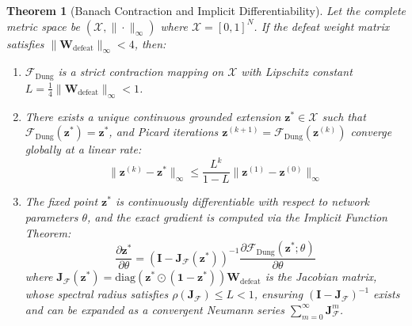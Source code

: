 \documentclass[11pt,a4paper]{article}
\newtheorem{theorem}{Theorem}
\begin{document}
\begin{theorem}[Banach Contraction and Implicit Differentiability]
\label{thm:banach_contraction}
Let the complete metric space be $(\mathcal{X}, \|\cdot\|_\infty)$ where $\mathcal{X} = [0, 1]^N$. If the defeat weight matrix satisfies $\|\mathbf{W}_{\text{defeat}}\|_\infty < 4$, then:
\begin{enumerate}[label=(\roman*)]
    \item $\mathcal{F}_{\text{Dung}}$ is a strict contraction mapping on $\mathcal{X}$ with Lipschitz constant $L = \frac{1}{4} \|\mathbf{W}_{\text{defeat}}\|_\infty < 1$.
    \item There exists a unique continuous grounded extension $\mathbf{z}^* \in \mathcal{X}$ such that $\mathcal{F}_{\text{Dung}}(\mathbf{z}^*) = \mathbf{z}^*$, and Picard iterations $\mathbf{z}^{(k+1)} = \mathcal{F}_{\text{Dung}}(\mathbf{z}^{(k)})$ converge globally at a linear rate:
    \begin{equation}
    \|\mathbf{z}^{(k)} - \mathbf{z}^*\|_\infty \le \frac{L^k}{1 - L} \|\mathbf{z}^{(1)} - \mathbf{z}^{(0)}\|_\infty
    \end{equation}
    \item The fixed point $\mathbf{z}^*$ is continuously differentiable with respect to network parameters $\theta$, and the exact gradient is computed via the Implicit Function Theorem:
    \begin{equation}
    \label{eq:implicit_grad}
    \frac{\partial \mathbf{z}^*}{\partial \theta} = \left( \mathbf{I} - \mathbf{J}_{\mathcal{F}}(\mathbf{z}^*) \right)^{-1} \frac{\partial \mathcal{F}_{\text{Dung}}(\mathbf{z}^*; \theta)}{\partial \theta}
    \end{equation}
    where $\mathbf{J}_{\mathcal{F}}(\mathbf{z}^*) = \mathrm{diag}(\mathbf{z}^* \odot (\mathbf{1} - \mathbf{z}^*)) \mathbf{W}_{\text{defeat}}$ is the Jacobian matrix, whose spectral radius satisfies $\rho(\mathbf{J}_{\mathcal{F}}) \le L < 1$, ensuring $(\mathbf{I} - \mathbf{J}_{\mathcal{F}})^{-1}$ exists and can be expanded as a convergent Neumann series $\sum_{m=0}^\infty \mathbf{J}_{\mathcal{F}}^m$.
\end{enumerate}
\end{theorem}
\end{document}
